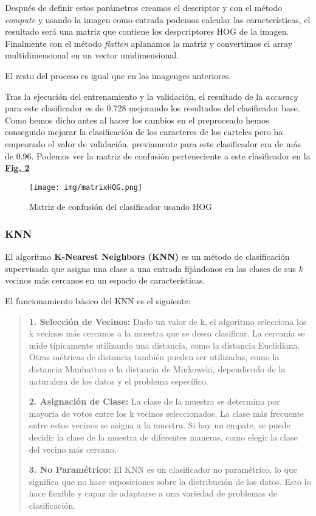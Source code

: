 \documentclass[a4paper, 12pt]{article}
\begin{document}
Después de definir estos parámetros creamos el descriptor y con el método \textit{compute} y usando la imagen como entrada podemos calcular las características, el resultado será una matriz que contiene los despcriptores HOG de la imagen. Finalmente con el método \textit{flatten} aplanamos la matriz y convertimos el array multidimensional en un vector unidimensional. 

El resto del proceso es igual que en las imagenges anteriores. 

Tras la ejecución del entrenamiento y la validación, el resultado de la \textit{accuracy} para este clasificador es de 0.728 mejorando los resultados del clasificador base. Como hemos dicho antes al hacer los cambios en el preproceado hemos conseguido mejorar la clasificación de los caracteres de los carteles pero ha empeorado el valor de validación, previamente para este clasificador era de más de 0.96. Podemos ver la matriz de confusión perteneciente a este clasificador en la  \textbf{\hyperref[fig:normalizacion]{Fig. 2}}

\begin{figure}[h]
	\centering
	\texttt{[image: img/matrixHOG.png]}
 	\caption{Matriz de confusión del clasificador usando HOG}\vspace{0.5cm}
	\label{fig:normalizacion}
\end{figure}


\subsubsection{KNN}
El algoritmo \textbf{K-Nearest Neighbors (KNN)} es un método de clasificación supervisada que asigna una clase a una entrada fijándonos en las clases de sus $k$ vecinos más cercanos en un espacio de características. 

El funcionamiento básico del KNN es el siguiente:

\begin{quote}
	\textbf{1. Selección de Vecinos:} Dado un valor de k, el algoritmo selecciona los k vecinos más cercanos a la muestra que se desea clasificar. La cercanía se mide típicamente utilizando una distancia, como la distancia Euclidiana. Otras métricas de distancia también pueden ser utilizadas, como la distancia Manhattan o la distancia de Minkowski, dependiendo de la naturaleza de los datos y el problema específico.
	
	\textbf{2. Asignación de Clase:} La clase de la muestra se determina por mayoría de votos entre los k vecinos seleccionados. La clase más frecuente entre estos vecinos se asigna a la muestra. Si hay un empate, se puede decidir la clase de la muestra de diferentes maneras, como elegir la clase del vecino más cercano.
	
	\textbf{3. No Paramétrico:} El KNN es un clasificador no paramétrico, lo que significa que no hace suposiciones sobre la distribución de los datos. Esto lo hace flexible y capaz de adaptarse a una variedad de problemas de clasificación.
	
\end{quote}
\end{document}

